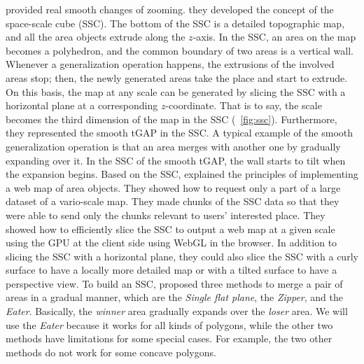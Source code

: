 \documentclass[]{interact}
\begin{document}
 provided real smooth changes of zooming.
they developed the concept of the space-scale cube (SSC).
The bottom of the SSC is a detailed topographic map,
and all the area objects extrude along the $z$-axis.
In the SSC, an area on the map becomes a polyhedron, and
the common boundary of two areas is a vertical wall.
Whenever a generalization operation happens, 
the extrusions of the involved areas stop;
then, the newly generated areas take the place and start to extrude.
On this basis, the map at any scale can be generated by slicing the SSC 
with a horizontal plane at a corresponding $z$-coordinate.
That is to say, the scale becomes the third dimension of the map in the SSC
(\eg~\fig\ref{fig:ssc}).
Furthermore, they represented the smooth tGAP in the SSC.
A typical example of the smooth generalization operation is that 
an area merges with another one by gradually expanding over it.
In the SSC of the smooth tGAP, 
the wall starts to tilt when the expansion begins.
Based on the SSC, \citet{Meijers2020Web} explained the principles of 
implementing a web map of area objects.
They showed how to request only a part of a large dataset of a vario-scale map.
They made chunks of the SSC data
so that they were able to send only the chunks relevant 
to users' interested place.
They showed how to efficiently slice the SSC 
to output a web map at a given scale 
using the GPU at the client side using WebGL in the browser.
In addition to slicing the SSC with a horizontal plane,
they could also slice the SSC with a curly surface 
to have a locally more detailed map
or with a tilted surface to have a perspective view.
To build an SSC, \citet{Suba2014Merge} proposed three methods 
to merge a pair of areas in a gradual manner, 
which are the \emph{Single flat plane}, 
the \emph{Zipper}, and the \emph{Eater}.
Basically, the \emph{winner} area gradually expands over the \emph{loser} area.
We will use the \emph{Eater} because it works for all kinds of polygons,
while the other two methods have limitations for some special cases.
For example, the two other methods do not work for some concave polygons.



\end{document}
